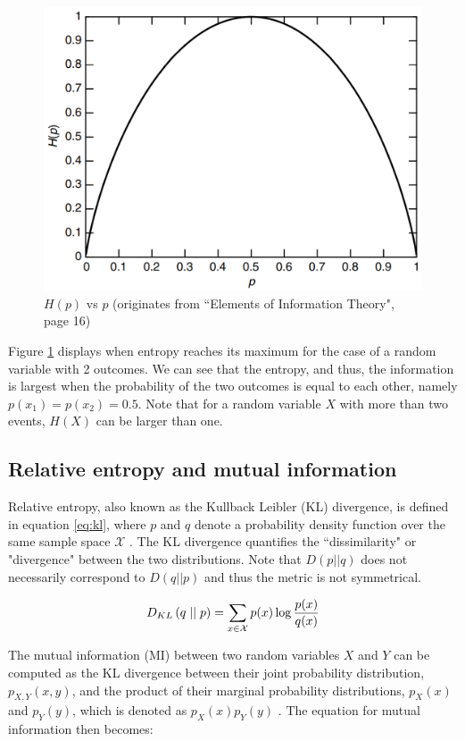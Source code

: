 \begin{figure}[h]
	\centering
	\includegraphics[width=0.4\linewidth]{screenshot005}
	\caption{$H(p)$ vs $p$ (originates from ``Elements of Information Theory", page 16)}
	\label{fig:EntropyvsP}
\end{figure}



Figure \ref{fig:EntropyvsP} displays when entropy reaches its maximum for the case of a random variable with 2 outcomes. We can see that the entropy, and thus, the information is largest when the probability of the two outcomes is equal to each other, namely $p(x_1)=p(x_2)=0.5$. Note that for a random variable $X$ with more than two events, $H(X)$ can be larger than one.

\subsection{Relative entropy and mutual information} \label{cha:rel_entrop}
Relative entropy, also known as the Kullback Leibler (KL) divergence, is defined in equation \ref{eq:kl}, where $p$ and $q$ denote a probability density function over the same sample space $\mathcal{X}$ \citep{coverElementsInformationTheory2006}. The KL divergence quantifies the ``dissimilarity" or "divergence" between the two distributions. Note that $D(p||q)$ does not necessarily correspond to $D(q||p)$ and thus the metric is not symmetrical.

\begin{equation}
	D_{KL} \left( q \mid \mid p \right) = \sum_{x\in\mathcal{X}}p(x) \log \frac{p(x)}{q(x)} \label{eq:kl}
\end{equation}



The mutual information (MI) between two random variables $X$ and $Y$ can be computed as the KL divergence between their joint probability distribution, $p_{X,Y}(x,y)$, and the product of their marginal probability distributions, $p_X(x)$ and $p_Y(y)$, which is denoted as $p_X(x)p_Y(y)$ \citep{coverElementsInformationTheory2006}. The equation for mutual information then becomes:

